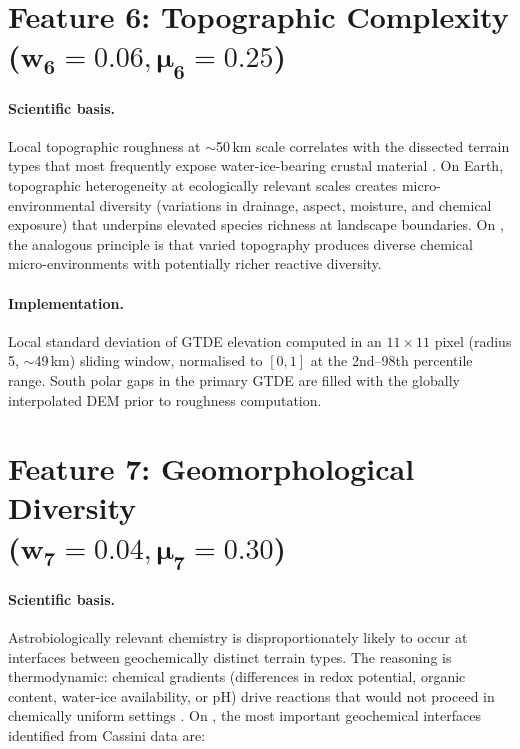 \section[Feature 6: Topographic Complexity
  ($w_6 = 0.06$, $\mu_6 = 0.25$)]{Feature 6: Topographic Complexity \\
  ($\boldsymbol{w_6 = 0.06, \mu_6 = 0.25}$)}
\label{sec:feat_topo}

\paragraph{Scientific basis.}
Local topographic roughness at $\sim$50\,km scale correlates with the
dissected terrain types that most frequently expose water-ice-bearing crustal
material \citep{Lopes2019}.  On Earth, topographic heterogeneity at ecologically
relevant scales creates micro-environmental diversity (variations in
drainage, aspect, moisture, and chemical exposure) that underpins elevated
species richness at landscape boundaries.  On \titan{}, the analogous principle
is that varied topography produces diverse chemical micro-environments with
potentially richer reactive diversity.

\paragraph{Implementation.}
Local standard deviation of GTDE elevation computed in an $11\times11$ pixel
(radius 5, $\sim$49\,km) sliding window, normalised to $[0,1]$ at the 2nd--98th
percentile range.  South polar gaps in the primary GTDE are filled with the
\citet{Corlies2017Titan} globally interpolated DEM prior to roughness computation.

\section[Feature 7: Geomorphological Diversity
  ($w_7 = 0.04$, $\mu_7 = 0.30$)]{Feature 7: Geomorphological Diversity \\
  ($\boldsymbol{w_7 = 0.04, \mu_7 = 0.30}$)}
\label{sec:feat_geodiv}

\paragraph{Scientific basis.}
Astrobiologically relevant chemistry is disproportionately likely to occur
at interfaces between geochemically distinct terrain types.  The reasoning
is thermodynamic: chemical gradients (differences in redox potential,
organic content, water-ice availability, or pH) drive reactions that would
not proceed in chemically uniform settings \citep{Shock2007}.  On \titan{},
the most important geochemical interfaces identified from Cassini data are:

